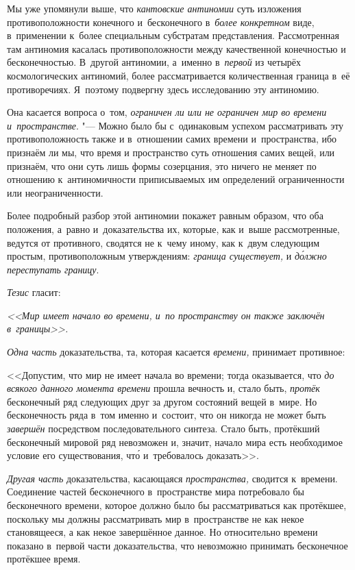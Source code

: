Мы уже упомянули выше, что {\em кантовские антиномии} суть изложения
противоположности конечного и~бесконечного в~{\em более конкретном} виде,
в~применении к~более специальным субстратам представления. Рассмотренная там
антиномия касалась противоположности между качественной конечностью и
бесконечностью. В~другой антиномии, а~именно в~{\em первой} из четырёх
космологических антиномий, более рассматривается количественная граница в~её
противоречиях. Я~поэтому подвергну здесь исследованию эту антиномию.

Она касается вопроса о~том,
{\em ограничен ли или не ограничен мир во времени и~пространстве}. "--- Можно
было бы с~одинаковым успехом рассматривать эту противоположность также
и в~отношении самих времени и~пространства, ибо признаём ли мы, что время
и пространство суть отношения самих вещей, или признаём, что они суть лишь
формы созерцания, это ничего не меняет по отношению к~антиномичности
приписываемых им определений ограниченности или неограниченности.

Более подробный разбор этой антиномии покажет равным образом, что оба
положения, а~равно и~доказательства их, которые, как и~выше рассмотренные,
ведутся от противного, сводятся не к~чему иному, как к~двум следующим простым,
противоположным утверждениям: {\em граница существует,} и
{\em д\'{о}лжно переступать границу}.

{\em Тезис} гласит:

{\em <<Мир имеет начало во времени, и~по пространству он
также заключён в~границы>>.}

{\em Одна часть} доказательства, та, которая касается
{\em времени,} принимает противное:

<<Допустим, что мир не имеет начала во времени; тогда оказывается, что
{\em до всякого данного момента времени} прошла вечность и, стало быть,
{\em протёк} бесконечный ряд следующих друг за другом состояний вещей в~мире.
Но бесконечность ряда в~том именно и~состоит, что он никогда не может быть
{\em завершён} посредством последовательного синтеза. Стало быть, протёкший
бесконечный мировой ряд невозможен и, значит, начало мира есть необходимое
условие его существования, чт\'{о} и~требовалось доказать>>.

{\em Другая часть} доказательства, касающаяся {\em пространства,} сводится
к~времени. Соединение частей бесконечного в~пространстве мира потребовало бы
бесконечного времени, которое должно было бы рассматриваться как протёкшее,
поскольку мы должны рассматривать мир в~пространстве не как некое становящееся,
а как некое завершённое данное. Но относительно времени показано в~первой части
доказательства, что невозможно принимать бесконечное протёкшее время.

